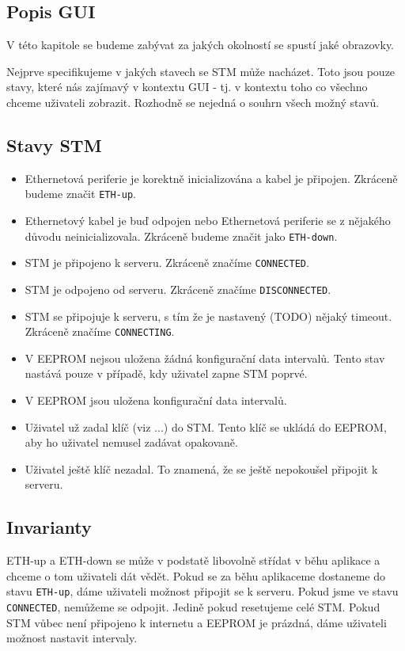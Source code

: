 
\subsection{Popis GUI}
V této kapitole se budeme zabývat za jakých okolností se spustí jaké obrazovky.

Nejprve specifikujeme v jakých stavech se STM může nacházet.
Toto jsou pouze stavy, které nás zajímavý v kontextu GUI - tj. v kontextu toho co všechno chceme
uživateli zobrazit.
Rozhodně se nejedná o souhrn všech možný stavů.
\subsection{Stavy STM}
\begin{itemize}
  \item Ethernetová periferie je korektně inicializována a kabel je připojen. Zkráceně budeme
        značit \texttt{ETH-up}.
  \item Ethernetový kabel je buď odpojen nebo Ethernetová periferie se z nějakého důvodu
        neinicializovala. Zkráceně budeme značit jako \texttt{ETH-down}.
  \item STM je připojeno k serveru. Zkráceně značíme \texttt{CONNECTED}.
  \item STM je odpojeno od serveru. Zkráceně značíme \texttt{DISCONNECTED}.
  \item STM se připojuje k serveru, s tím že je nastavený (TODO) nějaký timeout. Zkráceně značíme
        \texttt{CONNECTING}.
  \item V EEPROM nejsou uložena žádná konfigurační data intervalů. Tento stav nastává pouze v případě,
        kdy uživatel zapne STM poprvé.
  \item V EEPROM jsou uložena konfigurační data intervalů.
  \item Uživatel už zadal klíč (viz ...) do STM. Tento klíč se ukládá do EEPROM, aby ho uživatel
        nemusel zadávat opakovaně.
  \item Uživatel ještě klíč nezadal. To znamená, že se ještě nepokoušel připojit k serveru.
\end{itemize}

\subsection{Invarianty}
ETH-up a ETH-down se může v podstatě libovolně střídat v běhu aplikace a chceme o tom uživateli
dát vědět.
Pokud se za běhu aplikaceme dostaneme do stavu \texttt{ETH-up}, dáme uživateli možnost připojit
se k serveru.
Pokud jsme ve stavu \texttt{CONNECTED}, nemůžeme se odpojit. Jedině pokud resetujeme celé STM.
Pokud STM vůbec není připojeno k internetu a EEPROM je prázdná, dáme uživateli možnost nastavit
intervaly.

